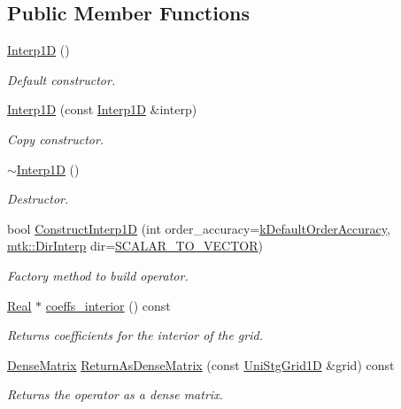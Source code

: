 \subsection*{Public Member Functions}
\begin{DoxyCompactItemize}
\item 
\hyperlink{classmtk_1_1Interp1D_ae56f90c53579c91c1dbe715f7e7361be}{Interp1\+D} ()
\begin{DoxyCompactList}\small\item\em Default constructor. \end{DoxyCompactList}\item 
\hyperlink{classmtk_1_1Interp1D_a92a5ed77144b3824d201a586f4072fd0}{Interp1\+D} (const \hyperlink{classmtk_1_1Interp1D}{Interp1\+D} \&interp)
\begin{DoxyCompactList}\small\item\em Copy constructor. \end{DoxyCompactList}\item 
\hyperlink{classmtk_1_1Interp1D_a52ea06b5e3d7082eb06ade256f4e30fb}{$\sim$\+Interp1\+D} ()
\begin{DoxyCompactList}\small\item\em Destructor. \end{DoxyCompactList}\item 
bool \hyperlink{classmtk_1_1Interp1D_ab1c8e12534886aa185b24be474d1056e}{Construct\+Interp1\+D} (int order\+\_\+accuracy=\hyperlink{group__c01-roots_ga0d95560098eb36420511103637b6952f}{k\+Default\+Order\+Accuracy}, \hyperlink{group__c02-enums_ga674ec67bd1baa04e5dc06c2bcc351972}{mtk\+::\+Dir\+Interp} dir=\hyperlink{namespacemtk_ga674ec67bd1baa04e5dc06c2bcc351972a53facfbeb6725b2bd220c8d9811a0673}{S\+C\+A\+L\+A\+R\+\_\+\+T\+O\+\_\+\+V\+E\+C\+T\+O\+R})
\begin{DoxyCompactList}\small\item\em Factory method to build operator. \end{DoxyCompactList}\item 
\hyperlink{group__c01-roots_gac080bbbf5cbb5502c9f00405f894857d}{Real} $\ast$ \hyperlink{classmtk_1_1Interp1D_a652289cbb0000d3f4e5e8d632aaf4b03}{coeffs\+\_\+interior} () const 
\begin{DoxyCompactList}\small\item\em Returns coefficients for the interior of the grid. \end{DoxyCompactList}\item 
\hyperlink{classmtk_1_1DenseMatrix}{Dense\+Matrix} \hyperlink{classmtk_1_1Interp1D_aee8126b8a4be378a30be4d95b43b384b}{Return\+As\+Dense\+Matrix} (const \hyperlink{classmtk_1_1UniStgGrid1D}{Uni\+Stg\+Grid1\+D} \&grid) const 
\begin{DoxyCompactList}\small\item\em Returns the operator as a dense matrix. \end{DoxyCompactList}\end{DoxyCompactItemize}
